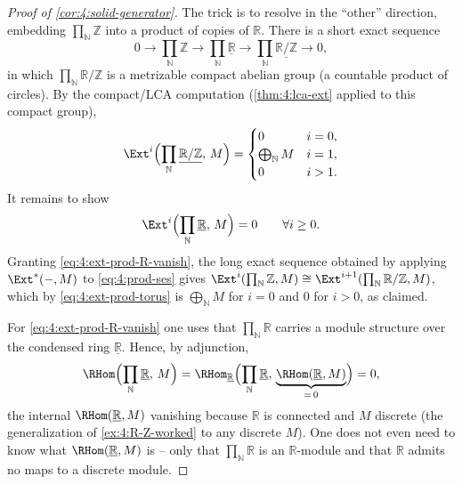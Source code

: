 \begin{proof}[Proof of \cref{cor:4:solid-generator}]
The trick is to resolve in the ``other'' direction, embedding
$\prod_{\mathbb{N}}\mathbb{Z}$ into a product of copies of $\mathbb{R}$. There is a
short exact sequence
\begin{equation}
\label{eq:4:prod-ses}
0\to\prod_{\mathbb{N}}\mathbb{Z}\to\prod_{\mathbb{N}}\underline{\mathbb{R}}\to
\prod_{\mathbb{N}}\underline{\mathbb{R}/\mathbb{Z}}\to0,
\end{equation}
in which $\prod_{\mathbb{N}}\mathbb{R}/\mathbb{Z}$ is a metrizable compact abelian
group (a countable product of circles). By the compact/LCA computation
(\cref{thm:4:lca-ext} applied to this compact group),
\begin{equation}
\label{eq:4:ext-prod-torus}
\Ext^{i}\Bigl(\prod_{\mathbb{N}}\underline{\mathbb{R}/\mathbb{Z}},\,M\Bigr)=
\begin{cases}
0 & i=0,\\
\bigoplus_{\mathbb{N}}M & i=1,\\
0 & i>1.
\end{cases}
\end{equation}
It remains to show
\begin{equation}
\label{eq:4:ext-prod-R-vanish}
\Ext^{i}\Bigl(\prod_{\mathbb{N}}\underline{\mathbb{R}},\,M\Bigr)=0
\qquad\forall i\geq0.
\end{equation}
Granting \eqref{eq:4:ext-prod-R-vanish}, the long exact sequence obtained by
applying $\Ext^{\ast}(-,M)$ to \eqref{eq:4:prod-ses} gives
$\Ext^{i}(\prod_{\mathbb{N}}\mathbb{Z},M)\cong
\Ext^{i+1}(\prod_{\mathbb{N}}\mathbb{R}/\mathbb{Z},M)$, which by
\eqref{eq:4:ext-prod-torus} is $\bigoplus_{\mathbb{N}}M$ for $i=0$ and $0$ for
$i>0$, as claimed.

For \eqref{eq:4:ext-prod-R-vanish} one uses that $\prod_{\mathbb{N}}\mathbb{R}$
carries a module structure over the condensed ring $\underline{\mathbb{R}}$.
Hence, by adjunction,
\begin{equation*}
\RHom\Bigl(\prod_{\mathbb{N}}\underline{\mathbb{R}},\,M\Bigr)
=\RHom_{\underline{\mathbb{R}}}\Bigl(\prod_{\mathbb{N}}\underline{\mathbb{R}},\,
\underbrace{\RHom(\underline{\mathbb{R}},M)}_{=\,0}\Bigr)=0,
\end{equation*}
the internal $\RHom(\underline{\mathbb{R}},M)$ vanishing because $\mathbb{R}$ is
connected and $M$ discrete (the generalization of \cref{ex:4:R-Z-worked} to any
discrete $M$). One does not even need to know what
$\RHom(\underline{\mathbb{R}},M)$ is -- only that
$\prod_{\mathbb{N}}\mathbb{R}$ is an $\mathbb{R}$-module and that $\mathbb{R}$
admits no maps to a discrete module.
\end{proof}

